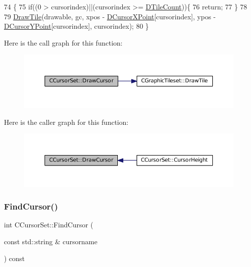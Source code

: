 \begin{DoxyCode}
74                                                                                                   \{
75     \textcolor{keywordflow}{if}((0 > cursorindex)||(cursorindex >= \hyperlink{classCGraphicTileset_a39d942b370e47f441bf97385eb1037c8}{DTileCount}))\{
76         \textcolor{keywordflow}{return};
77     \}
78     
79     \hyperlink{classCGraphicTileset_afefd501a74e95295b7cd2dc868dcbbcb}{DrawTile}(drawable, gc, xpos - \hyperlink{classCCursorSet_af36d1812e93362f15553c63876f2045b}{DCursorXPoint}[cursorindex], ypos - 
      \hyperlink{classCCursorSet_a581192f0e4414acce8b1da7f24ea1b98}{DCursorYPoint}[cursorindex], cursorindex);
80 \}
\end{DoxyCode}
Here is the call graph for this function\+:\nopagebreak
\begin{figure}[H]
\begin{center}
\leavevmode
\includegraphics[width=350pt]{classCCursorSet_ab28cc2871e723b2509a5036eac1086ba_cgraph}
\end{center}
\end{figure}
Here is the caller graph for this function\+:\nopagebreak
\begin{figure}[H]
\begin{center}
\leavevmode
\includegraphics[width=350pt]{classCCursorSet_ab28cc2871e723b2509a5036eac1086ba_icgraph}
\end{center}
\end{figure}
\hypertarget{classCCursorSet_a6a7ee8b41e6de490a7817b3f3ce5fb9f}{}\label{classCCursorSet_a6a7ee8b41e6de490a7817b3f3ce5fb9f} 
\subsubsection{\texorpdfstring{Find\+Cursor()}{FindCursor()}}
{\footnotesize\ttfamily int C\+Cursor\+Set\+::\+Find\+Cursor (\begin{DoxyParamCaption}\item[{const std\+::string \&}]{cursorname }\end{DoxyParamCaption}) const}



